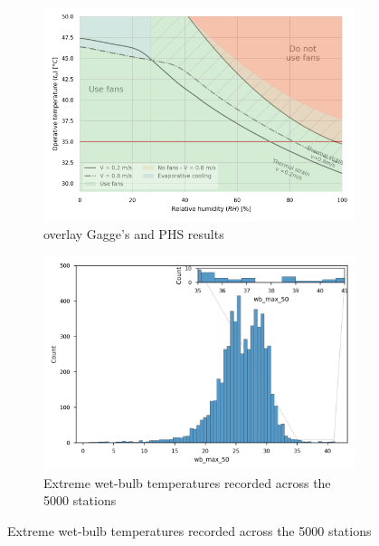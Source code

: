 \begin{figure}
\begin{subfigure}[t]{.75\textwidth}
        \includegraphics[width=1\linewidth]{figures/gagge_phs_overlay}
        \caption{
            overlay Gagge's and PHS results
        }
        \label{fig:gagge_phs}
    \end{subfigure}
    \hfill
        \centering
    \begin{subfigure}[t]{0.75\textwidth}
        \centering
        \includegraphics[width=1\linewidth]{figures/t_wb_extreme}
        \caption{
            Extreme wet-bulb temperatures recorded across the 5000 stations
        }
        \label{fig:t_wb_extreme}
    \end{subfigure}
\end{figure}


